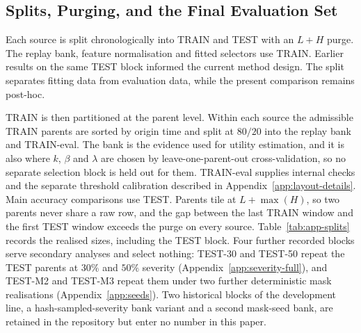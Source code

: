\documentclass{article}
\begin{document}
\subsection{Splits, Purging, and the Final Evaluation Set}
\label{app:splits}
Each source is split chronologically into TRAIN and TEST with an $L+H$ purge.
The replay bank, feature normalisation and fitted selectors use TRAIN. Earlier results on
the same TEST block informed the current method design. The split separates fitting data
from evaluation data, while the present comparison remains post-hoc.

TRAIN is then partitioned at the parent level. Within each source the admissible TRAIN parents
are sorted by origin time and split at $80/20$ into the replay bank and TRAIN-eval. The bank is
the evidence used for utility estimation, and it is also where $k$, $\beta$ and $\lambda$ are chosen by
leave-one-parent-out cross-validation, so no separate selection block is held out for them.
TRAIN-eval supplies internal checks and the separate threshold calibration described in
Appendix~\ref{app:layout-details}. Main accuracy comparisons use TEST. Parents tile at $L + \max(H)$, so two
parents never share a raw row, and the gap between the last TRAIN window and the first TEST
window exceeds the purge on every source.
Table~\ref{tab:app-splits} records the realised sizes, including the TEST block.
Four further recorded blocks serve secondary analyses and select nothing: TEST-30 and
TEST-50 repeat the TEST parents at $30\%$ and $50\%$ severity
(Appendix~\ref{app:severity-full}), and TEST-M2 and TEST-M3 repeat them under two further
deterministic mask realisations (Appendix~\ref{app:seeds}). Two historical blocks of the
development line, a hash-sampled-severity bank variant and a second mask-seed bank, are
retained in the repository but enter no number in this paper.

\begin{table}[htbp]
  \caption{Realised split sizes. Counts are of admissible parents and not of correlated mask
variants. A parent with several patterns or severities remains one cluster for resampling.
TEST is the evaluation population for every table in the main
  text, and it is disjoint from both TRAIN blocks.}
  \label{tab:app-splits}
  \centering
  \small
  \setlength{\tabcolsep}{4pt}
\end{table}
\end{document}
